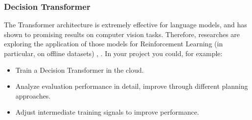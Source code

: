 \documentclass[a4paper]{article}
\begin{document}
\subsubsection{Decision Transformer}
The Transformer architecture is extremely effective for language models, and has shown to promising results on computer vision tasks.
Therefore, researches are exploring the application of those models for Reinforcement Learning (in particular, on offline datasets) \cite{DecisionTransformer2021}, \cite{OneBigSequence2021}. In your project you could, for example:
\begin{itemize}
  \item Train a Decision Transformer in the cloud.
  \item Analyze evaluation performance in detail, improve through different planning approaches.
  \item Adjust intermediate training signals to improve performance.
\end{itemize}


\end{document}
